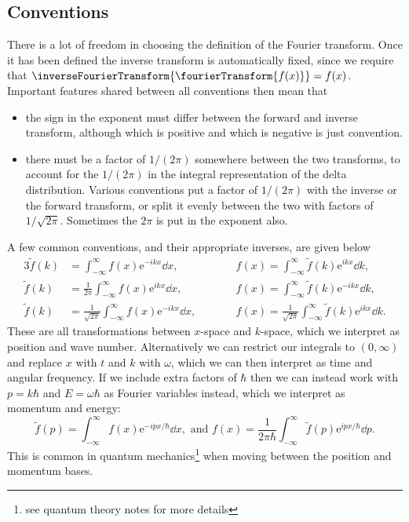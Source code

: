 \documentclass[fleqn]{NotesClass}
\newcommand*{\e}{\mathrm{e}}
\begin{document}
    \subsection{Conventions}
    There is a lot of freedom in choosing the definition of the Fourier transform.
    Once it has been defined the inverse transform is automatically fixed, since we require that \(\inverseFourierTransform\{\fourierTransform\{f(x)\}\} = f(x)\).
    Important features shared between all conventions then mean that
    \begin{itemize}
        \item the sign in the exponent must differ between the forward and inverse transform, although which is positive and which is negative is just convention.
        \item there must be a factor of \(1/(2\pi)\) somewhere between the two transforms, to account for the \(1/(2\pi)\) in the integral representation of the delta distribution.
        Various conventions put a factor of \(1/(2\pi)\) with the inverse or the forward transform, or split it evenly between the two with factors of \(1/\sqrt{2\pi}\).
        Sometimes the \(2\pi\) is put in the exponent also.
    \end{itemize}
    
    A few common conventions, and their appropriate inverses, are given below
    \begin{alignat}{3}
        \tilde{f}(k) &= \int_{-\infty}^{\infty} f(x)\e^{-ikx} \dd{x}, \qquad && f(x) = \int_{-\infty}^{\infty} \tilde{f}(k)\e^{ikx} \dd{k},\\
        \tilde{f}(k) &= \frac{1}{2\pi}\int_{-\infty}^{\infty} f(x)\e^{ikx} \dd{x}, \qquad && f(x) = \int_{-\infty}^{\infty} \tilde{f}(k)\e^{-ikx} \dd{k},\\
        \tilde{f}(k) &= \frac{1}{\sqrt{2\pi}} \int_{-\infty}^{\infty} f(x)\e^{-ikx} \dd{x}, \qquad && f(x) = \frac{1}{\sqrt{2\pi}} \int_{-\infty}^{\infty} \tilde{f}(k) \e^{ikx} \dd{k}.
    \end{alignat}
    These are all transformations between \(x\)-space and \(k\)-space, which we interpret as position and wave number.
    Alternatively we can restrict our integrals to \((0, \infty)\) and replace \(x\) with \(t\) and \(k\) with \(\omega\), which we can then interpret as time and angular frequency.
    If we include extra factors of \(\hbar\) then we can instead work with \(p = k\hbar\) and \(E = \omega\hbar\) as Fourier variables instead, which we interpret as momentum and energy:
    \begin{equation}
        \tilde{f}(p) = \int_{-\infty}^{\infty} f(x)\e^{-ipx/\hbar} \dd{x}, \text{ and } f(x) = \frac{1}{2\pi\hbar} \int_{-\infty}^{\infty} \tilde{f}(p)\e^{ipx/\hbar} \dd{p}.
    \end{equation}
    This is common in quantum mechanics\footnote{see quantum theory notes for more details} when moving between the position and momentum bases.
    
\end{document}
